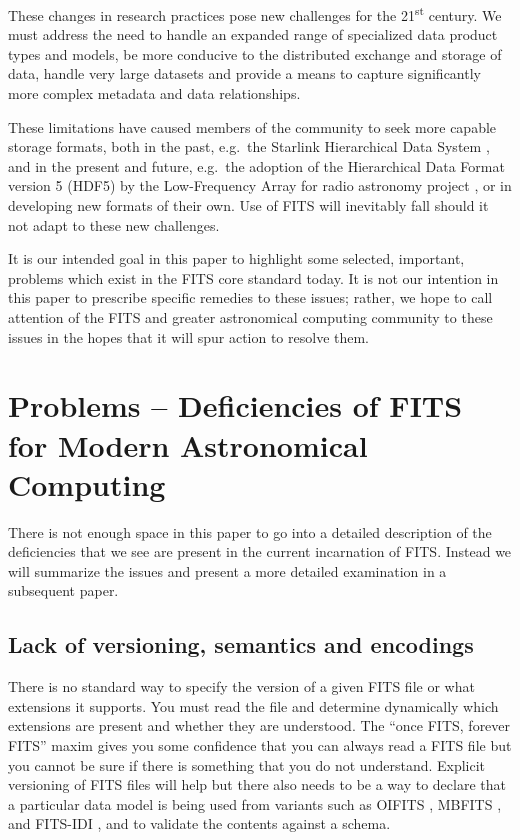 \documentclass[11pt,twoside]{article}
\begin{document}
These changes in research practices pose new challenges for the
21\textsuperscript{st} century. We must address the need to handle an expanded
range of specialized data product types and models, be more conducive to the
distributed exchange and storage of data, handle very large datasets and
provide a means to capture significantly more complex metadata and data
relationships.

These limitations have caused members of the community to seek more capable
storage formats, both in the past, e.g.\ the Starlink Hierarchical Data System
\citep[HDS;][]{1982QJRAS..23..485D}, and in the present and future, e.g.\ the
adoption of the Hierarchical Data Format version 5 (HDF5) by the Low-Frequency
Array for radio astronomy project \citep[LOFAR;][]{2011ASPC..442...53A}, or in
developing new formats of their own. Use of FITS will inevitably fall should it
not adapt to these new challenges.

It is our intended goal in this paper to highlight some selected,
important, problems which exist in the FITS core standard today. It is
not our intention in this paper to prescribe specific remedies to
these issues; rather, we hope to call attention of the FITS and
greater astronomical computing community to these issues in the hopes
that it will spur action to resolve them.

\section{Problems -- Deficiencies of FITS for Modern Astronomical Computing}

There is not enough space in this paper to go into a detailed
description of the deficiencies that we see are present in the current
incarnation of FITS. Instead we will summarize the issues and present
a more detailed examination in a subsequent paper.

\subsection{Lack of versioning, semantics and encodings}

There is no standard way to specify the version of a given FITS file or
what extensions it supports. You must read the file and determine
dynamically which extensions are present and whether they are
understood. The ``once FITS, forever FITS'' maxim gives you some
confidence that you can always read a FITS file but you cannot be sure
if there is something that you do not understand.  Explicit versioning
of FITS files will help but there also needs to be a way to declare that
a particular data model is being used from variants such as OIFITS
\citep{2006SPIE.6268E.106T}, MBFITS \citep{2006A&A...454L..25M}, and
FITS-IDI \citep{2011AIPS114}, and to validate the contents against a
schema.
\end{document}
